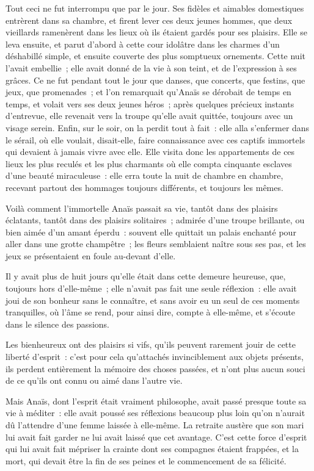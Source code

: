 \documentclass[french,twoside]{book} %
\begin{document}
Tout ceci ne fut interrompu que par le jour. Ses fidèles et aimables domestiques entrèrent dans sa chambre, et firent lever ces deux jeunes hommes, que deux vieillards ramenèrent dans les lieux où ils étaient gardés pour ses plaisirs. Elle se leva ensuite, et parut d’abord à cette cour idolâtre dans les charmes d’un déshabillé simple, et ensuite couverte des plus somptueux ornements. Cette nuit l’avait embellie ; elle avait donné de la vie à son teint, et de l’expression à ses grâces. Ce ne fut pendant tout le jour que danses, que concerts, que festins, que jeux, que promenades ; et l’on remarquait qu’Anaïs se dérobait de temps en temps, et volait vers ses deux jeunes héros ; après quelques précieux instants d’entrevue, elle revenait vers la troupe qu’elle avait quittée, toujours avec un visage serein. Enfin, sur le soir, on la perdit tout à fait : elle alla s’enfermer dans le sérail, où elle voulait, disait-elle, faire connaissance avec ces captifs immortels qui devaient à jamais vivre avec elle. Elle visita donc les appartements de ces lieux les plus reculés et les plus charmants où elle compta cinquante esclaves d’une beauté miraculeuse : elle erra toute la nuit de chambre en chambre, recevant partout des hommages toujours différents, et toujours les mêmes.\par
Voilà comment l’immortelle Anaïs passait sa vie, tantôt dans des plaisirs éclatants, tantôt dans des plaisirs solitaires ; admirée d’une troupe brillante, ou bien aimée d’un amant éperdu : souvent elle quittait un palais enchanté pour aller dans une grotte champêtre ; les fleurs semblaient naître sous ses pas, et les jeux se présentaient en foule au-devant d’elle.\par
Il y avait plus de huit jours qu’elle était dans cette demeure heureuse, que, toujours hors d’elle-même ; elle n’avait pas fait une seule réflexion : elle avait joui de son bonheur sans le connaître, et sans avoir eu un seul de ces moments tranquilles, où l’âme se rend, pour ainsi dire, compte à elle-même, et s’écoute dans le silence des passions.\par
Les bienheureux ont des plaisirs si vifs, qu’ils peuvent rarement jouir de cette liberté d’esprit : c’est pour cela qu’attachés invinciblement aux objets présents, ils perdent entièrement la mémoire des choses passées, et n’ont plus aucun souci de ce qu’ils ont connu ou aimé dans l’autre vie.\par
Mais Anaïs, dont l’esprit était vraiment philosophe, avait passé presque toute sa vie à méditer : elle avait poussé ses réflexions beaucoup plus loin qu’on n’aurait dû l’attendre d’une femme laissée à elle-même. La retraite austère que son mari lui avait fait garder ne lui avait laissé que cet avantage. C’est cette force d’esprit qui lui avait fait mépriser la crainte dont ses compagnes étaient frappées, et la mort, qui devait être la fin de ses peines et le commencement de sa félicité.\par
\end{document}
